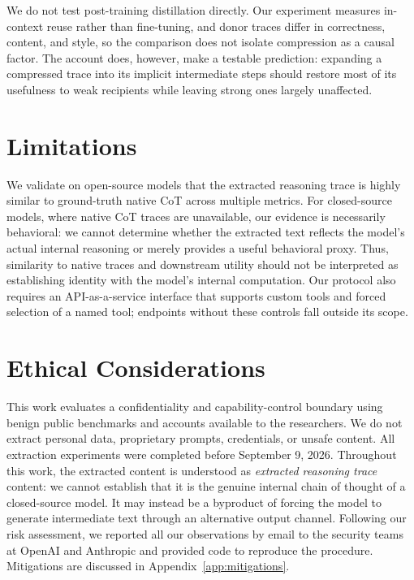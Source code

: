 \documentclass[10pt,letterpaper]{article}
\begin{document}
We do not test post-training distillation directly. Our experiment measures
in-context reuse rather than fine-tuning, and donor traces differ in correctness,
content, and style, so the comparison does not isolate compression as a causal
factor. The account does, however, make a testable prediction: expanding a
compressed trace into its implicit intermediate steps should restore most of its
usefulness to weak recipients while leaving strong ones largely unaffected.

\section{Limitations}
We validate on open-source models that the extracted reasoning trace is highly similar to ground-truth native CoT across multiple metrics. For closed-source models, where native CoT traces are unavailable, our evidence is necessarily behavioral: we cannot determine whether the extracted text reflects the model's actual internal reasoning or merely provides a useful behavioral proxy. Thus, similarity to native traces and downstream utility should not be interpreted as establishing identity with the model's internal computation. Our protocol also requires an API-as-a-service interface that supports custom tools and forced selection of a named tool; endpoints without these controls fall outside its scope.

\section{Ethical Considerations}

This work evaluates a confidentiality and capability-control boundary using benign public benchmarks and accounts available to the researchers.
We do not extract personal data, proprietary prompts, credentials, or unsafe content.
All extraction experiments were completed before September 9, 2026.
Throughout this work, the extracted content is understood as \emph{extracted reasoning trace} content: we cannot establish that it is the genuine internal chain of thought of a closed-source model.
It may instead be a byproduct of forcing the model to generate intermediate text through an alternative output channel.
Following our risk assessment, we reported all our observations by email to the security teams at OpenAI and Anthropic and provided code to reproduce the procedure. Mitigations are discussed in Appendix~\ref{app:mitigations}.
\end{document}
